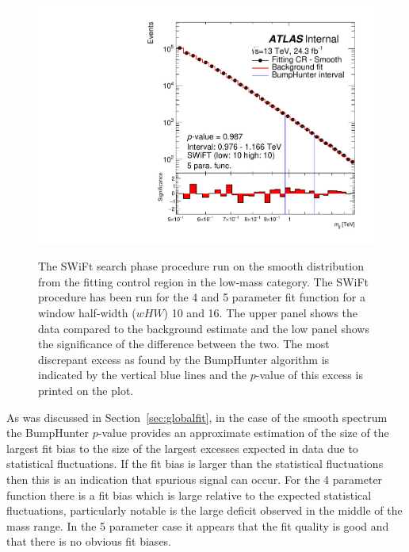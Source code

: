 \begin{figure}[!htb]
 {
  \includegraphics[width=0.45\linewidth, angle=0]{figs/Dibjet/LowMass/FitStudy/bhFit_corrFitCR_smooth_5para_low10_high10.pdf}
}
\vspace{10pt}
\caption{\label{fig:bhFit_lm_corrFitCR_smooth}
  The SWiFt search phase procedure run on the smooth distribution from the fitting control region in the low-mass category.
  The SWiFt procedure has been run for the 4 and 5 parameter fit function for a window half-width ($wHW$) 10 and 16.
  The upper panel shows the data compared to the background estimate and the low panel shows the significance of the difference between the two.
  The most discrepant excess as found by the {\sc BumpHunter} algorithm is indicated by the vertical blue lines and the \mbox{$p$-value} of this excess is printed on the plot. }
\end{figure}

As was discussed in Section~\ref{sec:globalfit}, in the case of the smooth spectrum the {\sc BumpHunter} \mbox{$p$-value} provides an approximate estimation
of the size of the largest fit bias to the size of the largest excesses expected in data due to statistical fluctuations.
If the fit bias is larger than the statistical fluctuations then this is an indication that spurious signal can occur. 
For the 4 parameter function there is a fit bias which is large relative to the expected statistical fluctuations,
particularly notable is the large deficit observed in the middle of the mass range.
In the 5 parameter case it appears that the fit quality is good and that there is no obvious fit biases.
 
